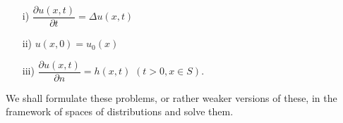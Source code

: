 \begin{itemize}
\begin{itemize}
\item [i)] $\dfrac{\partial u(x,t)}{\partial t} = \Delta u(x,t)$
\item [ii)] $u(x,0) = u_0(x)$
\item [iii)] $\dfrac{\partial u(x,t)}{\partial n}=h(x,t)$ $(t>0, x\in S)$.
\end{itemize}
We shall formulate these problems, or rather weaker versions of these,
in the framework of spaces of distributions and solve them.
\end{itemize}
